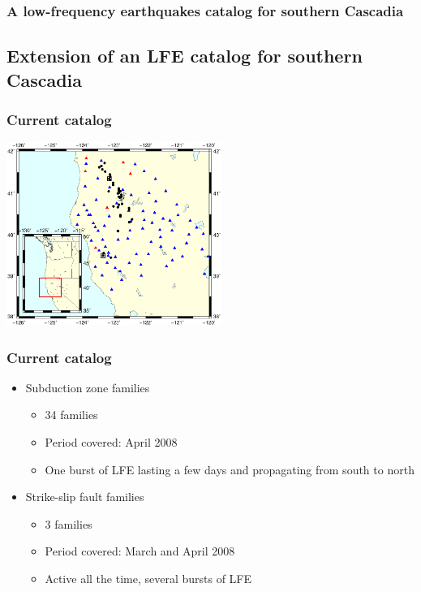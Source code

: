 \documentclass{beamer}
\begin{document}
	\begin{frame}
		\frametitle{A low-frequency earthquakes catalog for southern Cascadia}
	\end{frame}


	\subsection{Extension of an LFE catalog for southern Cascadia}
	
	\begin{frame}
		\frametitle{Current catalog}
		\begin{center}
			\includegraphics[trim={1cm 3cm 1cm 8cm}, clip, width=7cm]{catalog_SC/families_map.eps}
		\end{center}
	\end{frame}

	\begin{frame}
		\frametitle{Current catalog}
		\begin{itemize}
			\item Subduction zone families
			\begin{itemize}
				\item 34 families
				\item Period covered: April 2008
				\item One burst of LFE lasting a few days and propagating from south to north
			\end{itemize}
			\item Strike-slip fault families
			\begin{itemize}
				\item 3 families
				\item Period covered: March and April 2008
				\item Active all the time, several bursts of LFE
			\end{itemize}
		\end{itemize}
	\end{frame}
\end{document}
